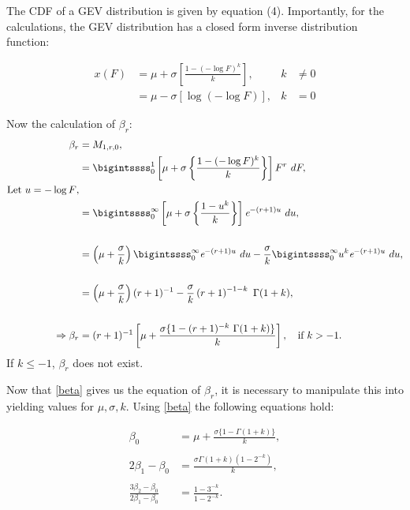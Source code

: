 \documentclass{article}
\begin{document}
The CDF of a GEV distribution is given by equation (4). Importantly, for the calculations, the GEV distribution has a closed form inverse distribution function:

\begin{align}
x(F) &= \mu + \sigma  \left [\frac{1 - (-\log F)^k}{k} \right ] , &k &\neq 0 \\
&= \mu - \sigma  \left [\log (-\log F)\right], &k&=0 \nonumber
\end{align}

Now the calculation of $\beta_r$:
\begingroup
\allowdisplaybreaks
\begin{align}
\beta_r &= M_{1,r,0}, \nonumber \\
&= \bigintssss_0^1 \left[ \mu + \sigma  \left \{\frac{1 - (-\log F)^k}{k} \right \} \right] F^r \ dF, \nonumber \\
\text{Let $u = -\log F$}, \nonumber \\
&= \bigintssss_0^{\infty} \left[ \mu + \sigma \left\{\frac{1-u^k}{k}\right \} \right] \textit{e}^{-(r+1)u} \ du, \nonumber \\
\nonumber \\
&= \left(\mu + \frac{\sigma}{k} \right) \bigintssss_0^{\infty} \textit{e}^{-(r+1)u} \ du - \frac{\sigma}{k} \bigintssss_0^{\infty} u^k \textit{e}^{-(r+1)u} \ du, \nonumber \\
\nonumber \\
&= \left(\mu + \frac{\sigma}{k} \right)(r+1)^{-1} - \frac{\sigma}{k} \left( r+1 \right)^{-1-k} \ \Gamma (1+k), \nonumber \\
\nonumber \\
\Rightarrow \beta_r &= (r+1)^{-1} \left [\mu + \frac{\sigma \{ 1 - (r+1)^{-k} \ \Gamma(1+k)\}}{k} \right], \quad \text{if }k > -1.\label{beta}
\end{align}
\endgroup
If $k \leq -1$, $\beta_r$ does not exist. 

Now that \eqref{beta} gives us the equation of $\beta_r$, it is necessary to manipulate this into yielding values for $\mu, \sigma, k$. Using \eqref{beta} the following equations hold:

\begin{align}
\beta_0 &= \mu + \frac{\sigma \{ 1 - \Gamma(1+k)\}}{k}, \\
\nonumber \\
2\beta_1 - \beta_0 &= \frac{\sigma \Gamma(1+k)(1-2^{-k})}{k}, \\
\nonumber \\
\frac{3\beta_2 - \beta_0}{2\beta_1 - \beta_0} &= \frac{1 - 3^{-k}}{1 - 2^{-k}}. \label{keqn}
\end{align}
\end{document}
